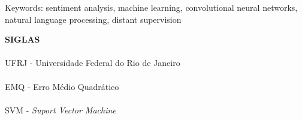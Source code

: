 \noindent Keywords: sentiment analysis, machine learning, convolutional neural networks, natural language processing,
distant supervision

\pagebreak

\begin{center}
\textbf{SIGLAS}
\end{center}
\vspace{0.5cm}

\paragraph{}UFRJ - Universidade Federal do Rio de Janeiro
\paragraph{}EMQ - Erro Médio Quadrático
\paragraph{}SVM - \textit{Suport Vector Machine}


\pagebreak
